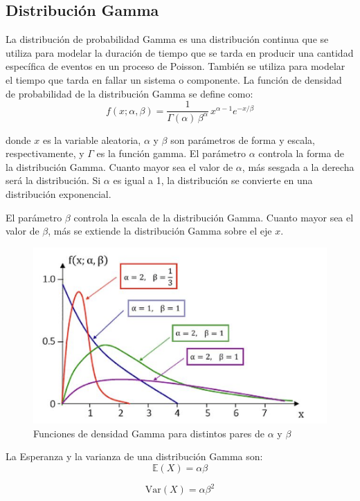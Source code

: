 \documentclass{article}
\begin{document}
\subsection{Distribución Gamma}
La distribución de probabilidad Gamma es una distribución continua que se utiliza para modelar la duración de tiempo que se tarda en producir una cantidad específica de eventos en un proceso de Poisson. También se utiliza para modelar el tiempo que tarda en fallar un sistema o componente.
La función de densidad de probabilidad de la distribución Gamma se define como:
\begin{equation}
    f(x; \alpha, \beta) = \frac{1}{\Gamma(\alpha) \, \beta^\alpha} \, x^{\alpha - 1} e^{-x/\beta}
\end{equation}

donde $x$ es la variable aleatoria, $\alpha$ y $\beta$ son parámetros de forma y escala, respectivamente, y $\Gamma$ es la función gamma. El parámetro $\alpha$ controla la forma de la distribución Gamma. Cuanto mayor sea el valor de $\alpha$, más sesgada a la derecha será la distribución. Si $\alpha$ es igual a 1, la distribución se convierte en una distribución exponencial.

 El parámetro $\beta$ controla la escala de la distribución Gamma. Cuanto mayor sea el valor de $\beta$, más se extiende la distribución Gamma sobre el eje $x$.
 
\begin{figure}[H]
    \centering
    \includegraphics[width=0.5\linewidth]{Imagenes/Funciones de densidad Gamma para distintos pares de α y β.png}
    \caption{Funciones de densidad Gamma para distintos pares de $\alpha$ y $\beta$}
    \label{fig:Func.Densidad Gamma}
\end{figure}

La Esperanza y la varianza de una distribución Gamma son:
\begin{equation}
    \mathbb{E}(X) = \alpha \beta
\end{equation}

\begin{equation}
    \mathrm{Var}(X) = \alpha \beta^2
\end{equation}
\end{document}
